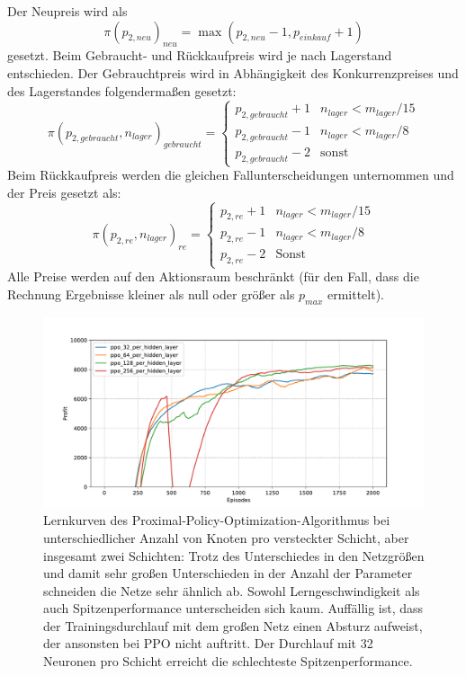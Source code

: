 Der Neupreis wird als
\begin{equation}
	\pi\left(p_{2, neu}\right)_{neu} = \max{\left(p_{2, neu} - 1, p_{einkauf} + 1\right)}
\end{equation}
gesetzt.
Beim Gebraucht- und Rückkaufpreis wird je nach Lagerstand entschieden.
Der Gebrauchtpreis wird in Abhängigkeit des Konkurrenzpreises und des Lagerstandes folgendermaßen gesetzt:
\begin{equation}
	\pi\left(p_{2, gebraucht}, n_{lager}\right)_{gebraucht} =
	\begin{cases}
		p_{2, gebraucht} + 1 & n_{lager} < m_{lager} / 15\\
		p_{2, gebraucht} - 1 & n_{lager} < m_{lager} / 8\\
		p_{2, gebraucht} - 2 & \text{sonst}
	\end{cases}
\end{equation}
Beim Rückkaufpreis werden die gleichen Fallunterscheidungen unternommen und der Preis gesetzt als:
\begin{equation}
	\pi(p_{2, re}, n_{lager})_{re} =
	\begin{cases}
		p_{2, re} + 1 & n_{lager} < m_{lager} / 15\\
		p_{2, re} - 1 & n_{lager} < m_{lager} / 8\\
		p_{2, re} - 2 & \text{Sonst}
	\end{cases}
\end{equation}
Alle Preise werden auf den Aktionsraum beschränkt (für den Fall, dass die Rechnung Ergebnisse kleiner als null oder größer als $p_{max}$ ermittelt).
\clearpage
{}
\begin{figure}[htb]
	\centering
	\includegraphics[width=\textwidth]{appendix/ppo_different_networks.pdf}
	\caption{
		Lernkurven des Proximal-Policy-Optimization-Algorithmus bei unterschiedlicher Anzahl von Knoten pro versteckter Schicht, aber insgesamt zwei Schichten:
        Trotz des Unterschiedes in den Netzgrößen und damit sehr großen Unterschieden in der Anzahl der Parameter schneiden die Netze sehr ähnlich ab.
        Sowohl Lerngeschwindigkeit als auch Spitzenperformance unterscheiden sich kaum.
        Auffällig ist, dass der Trainingsdurchlauf mit dem großen Netz einen Absturz aufweist, der ansonsten bei PPO nicht auftritt.
        Der Durchlauf mit 32 Neuronen pro Schicht erreicht die schlechteste Spitzenperformance.
	}
	\label{graphic:PPODifferentNetworks}
\end{figure}
